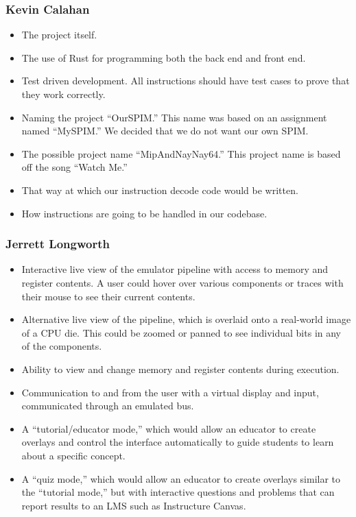 \documentclass[
    paper=letter,
    parskip=half,
    fontsize=12pt,
    titlepage=firstiscover,
    toc=bibliography,
    numbers=endperiod
]{scrartcl}
\begin{document}
\subsubsection{Kevin Calahan}
\begin{itemize}
    \item The project itself.
    \item The use of Rust for programming both the back end and front end.
    \item Test driven development. All instructions should have test cases to prove that they work correctly.
    \item Naming the project “OurSPIM.” This name was based on an assignment named “MySPIM.” We decided that we do not want our own SPIM.
    \item The possible project name “MipAndNayNay64.” This project name is based off the song “Watch Me.”
    \item That way at which our instruction decode code would be written.
    \item How instructions are going to be handled in our codebase.
\end{itemize}

\subsubsection{Jerrett Longworth}
\begin{itemize}
    \item Interactive live view of the emulator pipeline with access to memory and register contents. A user could hover over various components or traces with their mouse to see their current contents.
    \item Alternative live view of the pipeline, which is overlaid onto a real-world image of a CPU die. This could be zoomed or panned to see individual bits in any of the components.
    \item Ability to view and change memory and register contents during execution.
    \item Communication to and from the user with a virtual display and input, communicated through an emulated bus.
    \item A “tutorial/educator mode,” which would allow an educator to create overlays and control the interface automatically to guide students to learn about a specific concept.
    \item A “quiz mode,” which would allow an educator to create overlays similar to the “tutorial mode,” but with interactive questions and problems that can report results to an LMS such as Instructure Canvas.
\end{itemize}
\end{document}

